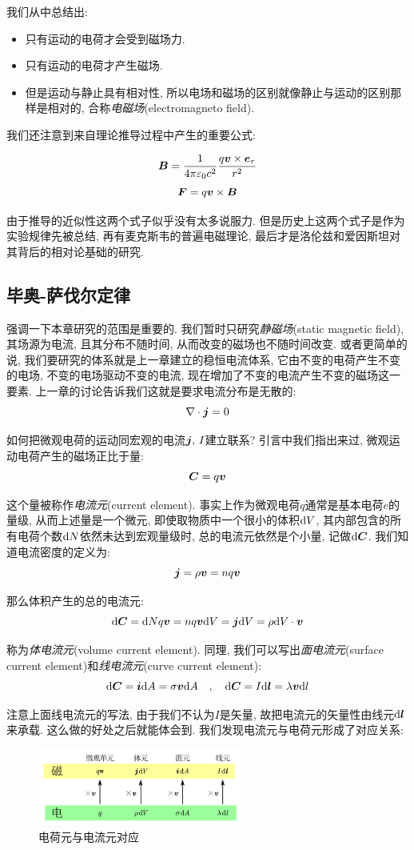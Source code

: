 我们从中总结出:
\begin{itemize}
	\item 只有运动的电荷才会受到磁场力.
	\item 只有运动的电荷才产生磁场.
	\item 但是运动与静止具有相对性, 所以电场和磁场的区别就像静止与运动的区别那样是相对的, 合称\emph{电磁场}(electromagneto field).
\end{itemize}

我们还注意到来自理论推导过程中产生的重要公式:

\[\boldsymbol{B}=\frac{1}{4\pi \varepsilon_0 c^2}\frac{q\boldsymbol{v}\times \boldsymbol{e}_r}{r^2}\]
\[\boldsymbol{F}=q\boldsymbol{v}\times \boldsymbol{B}\]

由于推导的近似性这两个式子似乎没有太多说服力. 但是历史上这两个式子是作为实验规律先被总结, 再有麦克斯韦的普遍电磁理论, 最后才是洛伦兹和爱因斯坦对其背后的相对论基础的研究.


\subsection{毕奥-萨伐尔定律}

强调一下本章研究的范围是重要的. 我们暂时只研究\emph{静磁场}(static magnetic field), 其场源为电流, 且其分布不随时间, 从而改变的磁场也不随时间改变. 或者更简单的说, 我们要研究的体系就是上一章建立的稳恒电流体系, 它由不变的电荷产生不变的电场, 不变的电场驱动不变的电流, 现在增加了不变的电流产生不变的磁场这一要素. 上一章的讨论告诉我们这就是要求电流分布是无散的:
\[\nabla \cdot \boldsymbol{j}=0\]

如何把微观电荷的运动同宏观的电流$\boldsymbol{j},\,I$建立联系? 引言中我们指出来过, 微观运动电荷产生的磁场正比于量:
\[\boldsymbol{C}=q\boldsymbol{v}\]

这个量被称作\emph{电流元}(current element). 事实上作为微观电荷$q$通常是基本电荷$e$的量级, 从而上述量是一个微元, 即使取物质中一个很小的体积$\textrm{d} V$, 其内部包含的所有电荷个数$\textrm{d} N$依然未达到宏观量级时, 总的电流元依然是个小量, 记做$\textrm{d}\boldsymbol{C}$. 我们知道电流密度的定义为:
\[\boldsymbol{j}=\rho\boldsymbol{v}=nq\boldsymbol{v}\]

那么体积产生的总的电流元:
\[\textrm{d} \boldsymbol{C}=\textrm{d} N q\boldsymbol{v}=nq\boldsymbol{v}\textrm{d} V=\boldsymbol{j}\textrm{d} V=\rho\textrm{d} V\cdot\boldsymbol{v}\]

称为\emph{体电流元}(volume current element). 同理, 我们可以写出\emph{面电流元}(surface current element)和\emph{线电流元}(curve current element):
\[\textrm{d} \boldsymbol{C}=\boldsymbol{i}\textrm{d} A=\sigma\boldsymbol{v}\textrm{d} A\quad ,\quad \textrm{d} \boldsymbol{C}=I\textrm{d} \boldsymbol{l}=\lambda \boldsymbol{v}\textrm{d} l\]

注意上面线电流元的写法, 由于我们不认为$I$是矢量, 故把电流元的矢量性由线元$\textrm{d} \boldsymbol{l}$来承载. 这么做的好处之后就能体会到. 我们发现电流元与电荷元形成了对应关系:
\begin{figure}[H]
\centering
\includegraphics[width=0.6\textwidth]{image/7-4-4.png}
\caption{电荷元与电流元对应}
\end{figure}

